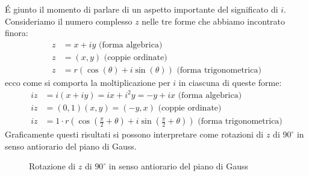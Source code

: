 \documentclass{book}
\begin{document}
\begin{curiosity}
    \'E giunto il momento di parlare di un aspetto importante del significato di \(i\). Consideriamo il numero complesso \(z\) nelle tre forme che abbiamo incontrato finora:
    \begin{align*}
        z & = x + iy \text{ (forma algebrica)}                                \\
        z & = (x, y) \text{ (coppie ordinate)}                                \\
        z & = r(\cos(\theta) + i \sin(\theta)) \text{ (forma trigonometrica)}
    \end{align*}
    ecco come si comporta la moltiplicazione per \(i\) in ciascuna di queste forme:
    \begin{align*}
        iz & = i(x + iy) = ix + i^2y = -y + ix \text{ (forma algebrica)}                                               \\
        iz & = (0,1)(x,y) = (-y, x) \text{ (coppie ordinate)}                                                          \\
        iz & = 1 \cdot r(\cos(\frac{\pi}{2} + \theta) + i \sin(\frac{\pi}{2} + \theta)) \text{ (forma trigonometrica)}
    \end{align*}
    Graficamente questi risultati si possono interpretare come rotazioni di \(z\) di \(90^\circ\) in senso antiorario del piano di Gauss.
    \begin{figure}[H]
        \centering
        \caption{Rotazione di \(z\) di \(90^\circ\) in senso antiorario del piano di Gauss}
        \label{fig:rotazione}
    \end{figure}
\end{curiosity}
\end{document}
